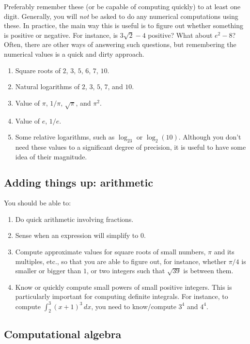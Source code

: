 \documentclass[10pt]{amsart}
\begin{document}
Preferably remember these (or be capable of computing quickly) to at
least one digit. Generally, you will {\em not} be asked to do any
numerical computations using these. In practice, the main way this is
useful is to figure out whether something is positive or negative. For
instance, is $3\sqrt{2} - 4$ positive? What about $e^2 - 8$? Often,
there are other ways of answering such questions, but remembering the
numerical values is a quick and dirty approach.

\begin{enumerate}
\item Square roots of $2$, $3$, $5$, $6$, $7$, $10$.
\item Natural logarithms of $2$, $3$, $5$, $7$, and $10$.
\item Value of $\pi$, $1/\pi$, $\sqrt{\pi}$, and $\pi^2$.
\item Value of $e$, $1/e$.
\item Some relative logarithms, such as $\log_23$ or
  $\log_2(10)$. Although you don't need these values to a significant
  degree of precision, it is useful to have some idea of their
  magnitude.
\end{enumerate}

\subsection{Adding things up: arithmetic}

You should be able to:

\begin{enumerate}
\item Do quick arithmetic involving fractions.
\item Sense when an expression will simplify to $0$.
\item Compute approximate values for square roots of small numbers,
  $\pi$ and its multiples, etc., so that you are able to figure out,
  for instance, whether $\pi/4$ is smaller or bigger than $1$, or two
  integers such that $\sqrt{39}$ is between them.
\item Know or quickly compute small powers of small positive
  integers. This is particularly important for computing definite
  integrals. For instance, to compute $\int_2^3 (x + 1)^3 \, dx$, you
  need to know/compute $3^4$ and $4^4$.
\end{enumerate}

\subsection{Computational algebra}
\end{document}
